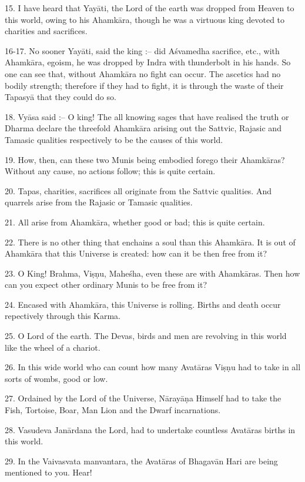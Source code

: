 15. I have heard that Yay\=ati, the Lord of the earth was dropped from Heaven to this world, owing to his Ahamk\=ara, though he was a virtuous king devoted to charities and sacrifices.

16-17. No sooner Yay\=ati, said the king :-- did A\'svamedha sacrifice, etc., with Ahamk\=ara, egoism, he was dropped by Indra with thunderbolt in his hands. So one can see that, without Ahamk\=ara no fight can occur. The ascetics had no bodily strength; therefore if they had to fight, it is through the waste of their Tapasy\=a that they could do so.

18. Vy\=asa said :-- O king! The all knowing sages that have realised the truth or Dharma declare the threefold Ahamk\=ara arising out the Sattvic, Rajasic and Tamasic qualities respectively to be the causes of this world.

19. How, then, can these two Munis being embodied forego their Ahamk\=aras? Without any cause, no actions follow; this is quite certain.

20. Tapas, charities, sacrifices all originate from the Sattvic qualities. And quarrels arise from the Rajasic or Tamasic qualities.

21. All arise from Ahamk\=ara, whether good or bad; this is quite certain.

22. There is no other thing that enchains a soul than this Ahamk\=ara. It is out of Ahamk\=ara that this Universe is created: how can it be then free from it?

23. O King! Brahma, Vi\d{s}\d{n}u, Mahe\'sha, even these are with Ahamk\=aras. Then how can you expect other ordinary Munis to be free from it?

24. Encased with Ahamk\=ara, this Universe is rolling. Births and death occur repectively through this Karma.

25. O Lord of the earth. The Devas, birds and men are revolving in this world like the wheel of a chariot.

26. In this wide world who can count how many Avat\=aras Vi\d{s}\d{n}u had to take in all sorts of wombs, good or low.

27. Ordained by the Lord of the Universe, N\=aray\=a\d{n}a Himself had to take the Fish, Tortoise, Boar, Man Lion and the Dwarf incarnations.

28. Vasudeva Jan\=ardana the Lord, had to undertake countless Avat\=aras births in this world.

29. In the Vaivasvata manvantara, the Avat\=aras of Bhagav\=an Hari are being mentioned to you. Hear!


